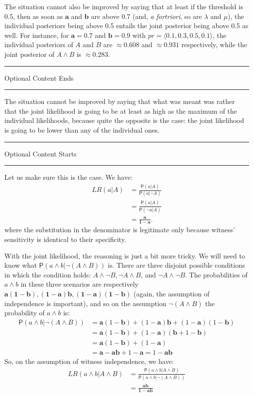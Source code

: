 \documentclass[
  10pt,
  dvipsnames,enabledeprecatedfontcommands]{scrartcl}
\newcommand{\ra}{\rangle}
\newcommand{\la}{\langle}
\newcommand{\n}{\neg}
\newcommand{\et}{\wedge}
\newcommand{\pr}[1]{\mathsf{P}(#1)}
\newcommand{\intermezzoa}{
	\begin{minipage}[c]{13cm}
	\begin{center}\rule{10cm}{0.4pt}



	\tiny{\sc Optional Content Starts}
	
	\vspace{-1mm}
	
	\rule{10cm}{0.4pt}\end{center}
	\end{minipage}\nopagebreak 
	}
\newcommand{\intermezzob}{\nopagebreak 
	\begin{minipage}[c]{13cm}
	\begin{center}\rule{10cm}{0.4pt}

	\tiny{\sc Optional Content Ends}
	
	\vspace{-1mm}
	
	\rule{10cm}{0.4pt}\end{center}
	\end{minipage}
	}
\begin{document}
The situation cannot also be improved by saying that at least if the
threshold is 0.5, then as soon as \(\mathbf{a}\) and \(\mathbf{b}\) are
above 0.7 (and, \emph{a fortriori}, so are \(\lambda\) and \(\mu\)), the
individual posteriors being above 0.5 entails the joint posterior being
above 0.5 as well. For instance, for \(\mathbf{a}=0.7\) and
\(\mathbf{b}=0.9\) with \(pr= \la 0.1, 0.3, 0.5, 0.1\ra\), the
individual posteriors of \(A\) and \(B\) are \(\approx 0.608\) and
\(\approx 0.931\) respectively, while the joint posterior of \(A\et B\)
is \(\approx 0.283\).

\intermezzob

The situation cannot be improved by saying that what was meant was
rather that the joint likelihood is going to be at least as high as the
maximum of the individual likelihoods, because quite the opposite is the
case: the joint likelihood is going to be lower than any of the
individual ones.

\intermezzoa

Let us make sure this is the case. We have: \begin{align*}
 LR(a\vert A) & = \frac{\pr{a\vert A}}{\pr{a\vert \n A}}\\
 &= \frac{\pr{a\vert A}}{\pr{\n a\vert  A}} \\
& =  \frac{\mathbf{a}}{\mathbf{1-a}}.
\end{align*} where the substitution in the denominator is legitimate
only because witness' sensitivity is identical to their specificity.

With the joint likelihood, the reasoning is just a bit more tricky. We
will need to know what \(\pr{a\et b \vert \n (A\et B)}\) is. There are
three disjoint possible conditions in which the condition holds:
\(A\et \n B, \n A \et B\), and \(\n A \et \n B\). The probabilities of
\(a\et b\) in these three scenarios are respectively
\(\mathbf{a(1-b),(1-a)b,(1-a)(1-b)}\) (again, the assumption of
independence is important), and so on the assumption \(\n(A\et B)\) the
probability of \(a\et b\) is: \begin{align*}
\pr{a\et b \vert \n (A\et B)} & = 
\mathbf{a}(1-\mathbf{b})+(1-\mathbf{a})\mathbf{b}+(1-\mathbf{a})(1-\mathbf{b})\\ 
& = 
\mathbf{a}(1-\mathbf{b})+(1-\mathbf{a})(\mathbf{b} + 1-\mathbf{b})\\
& = \mathbf{a}(1-\mathbf{b})+(1-\mathbf{a})\\
& = \mathbf{a}-\mathbf{a}\mathbf{b}+1-\mathbf{a} = 1- \mathbf{a}\mathbf{b}
\end{align*} So, on the assumption of witness independence, we have:
\begin{align*}
LR(a\et b \vert A \et B) & = \frac{\pr{a\et b \vert A \et B}}{\pr{a \et b\vert \n (A \et B)}} \\
& = \frac{\mathbf{ab}}{\mathbf{1-ab}}
\end{align*}
\end{document}
